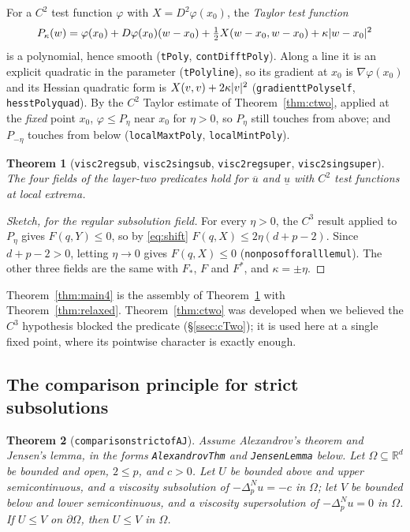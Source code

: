 \documentclass[11pt,reqno]{amsart}
\newcommand{\LEANREF}[1]{\texttt{\small\def\_{\textunderscore\allowbreak}#1}}
\newcommand{\R}{\mathbb{R}}
\newcommand{\pnlap}{\Delta_p^{N}}
\DeclarePairedDelimiter{\abs}{\lvert}{\rvert}
\theoremstyle{plain}
\newtheorem{theorem}{Theorem}[section]
\theoremstyle{definition}
\begin{document}
For a $C^2$ test function $\varphi$ with $X = D^2\varphi(x_0)$, the
\emph{Taylor test function}
\[
  P_\kappa(w) = \varphi(x_0) + D\varphi(x_0)(w - x_0)
    + \tfrac12 X(w - x_0, w - x_0) + \kappa\abs{w - x_0}^2
\]
is a polynomial, hence smooth (\LEANREF{tPoly}, \LEANREF{contDiff\_tPoly}).
Along a line it is an explicit quadratic in the parameter
(\LEANREF{tPoly\_line}), so its gradient at $x_0$ is $\nabla\varphi(x_0)$ and
its Hessian quadratic form is $X(v,v) + 2\kappa\abs{v}^2$
(\LEANREF{gradient\_tPoly\_self}, \LEANREF{hess\_tPoly\_quad}). By the $C^2$
Taylor estimate of Theorem~\ref{thm:ctwo}, applied at the \emph{fixed} point
$x_0$, $\varphi \le P_\eta$ near $x_0$ for $\eta > 0$, so $P_\eta$ still touches
from above; and $P_{-\eta}$ touches from below
(\LEANREF{localMax\_tPoly}, \LEANREF{localMin\_tPoly}).

\begin{theorem}[\LEANREF{visc2\_reg\_sub}, \LEANREF{visc2\_sing\_sub},
\LEANREF{visc2\_reg\_super}, \LEANREF{visc2\_sing\_super}]\label{thm:c2reduce}
The four fields of the layer-two predicates hold for $\overline{u}$ and
$\underline{u}$ with $C^2$ test functions at local extrema.
\end{theorem}

\begin{proof}[Sketch, for the regular subsolution field]
For every $\eta > 0$, the $C^3$ result applied to $P_\eta$ gives
$F(q, Y) \le 0$, so by \eqref{eq:shift}
$F(q, X) \le 2\eta(d + p - 2)$. Since $d + p - 2 > 0$, letting $\eta \to 0$
gives $F(q, X) \le 0$ (\LEANREF{nonpos\_of\_forall\_le\_mul}). The other three
fields are the same with $F_*$, $F$ and $F^*$, and $\kappa = \pm\eta$.
\end{proof}

Theorem~\ref{thm:main4} is the assembly of Theorem~\ref{thm:c2reduce} with
Theorem~\ref{thm:relaxed}. Theorem~\ref{thm:ctwo} was developed when we believed
the $C^3$ hypothesis blocked the predicate (\S\ref{ssec:cTwo}); it is used here
at a single fixed point, where its pointwise character is exactly enough.

\subsection{The comparison principle for strict subsolutions}\label{ssec:strictcomp}

\begin{theorem}[\LEANREF{comparison\_strict\_of\_AJ}]\label{thm:strictcomp}
Assume Alexandrov's theorem and Jensen's lemma, in the forms
\LEANREF{AlexandrovThm} and \LEANREF{JensenLemma} below. Let
$\Omega \subseteq \R^d$ be bounded and open, $2 \le p$, and $c > 0$. Let $U$ be
bounded above and upper semicontinuous, and a viscosity subsolution of
$-\pnlap u = -c$ in $\Omega$; let $V$ be bounded below and lower semicontinuous,
and a viscosity supersolution of $-\pnlap u = 0$ in $\Omega$. If $U \le V$ on
$\partial\Omega$, then $U \le V$ in $\Omega$.
\end{theorem}
\end{document}
